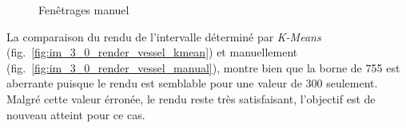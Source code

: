 	\begin{figure}[!ht]	%
	  \centering
			\hspace{1em}
		\caption{Fenêtrages manuel}
		\label{fig:tumor_windowing}
	\end{figure}

	La comparaison du rendu de l'intervalle déterminé par \emph{K-Means} (fig.~\ref{fig:im_3_0_render_vessel_kmean}) et manuellement (fig.~\ref{fig:im_3_0_render_vessel_manual}), montre bien que la borne de 755 est aberrante puisque le rendu est semblable pour une valeur de 300 seulement. Malgré cette valeur érronée, le rendu reste très satisfaisant, l'objectif est de nouveau atteint pour ce cas.

	
				

